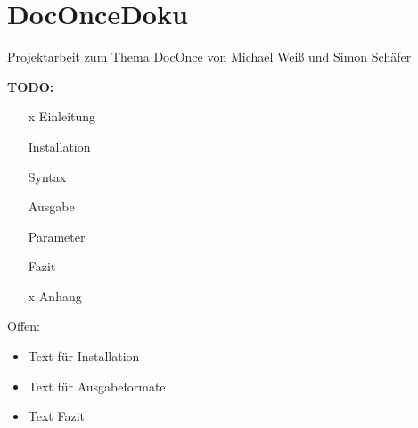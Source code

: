 \documentclass[%
oneside,                 %
final,                   %
chapterprefix=true,      %
open=right,              %
10pt]{book}
\begin{document}



\chapter{DocOnceDoku}
Projektarbeit zum Thema DocOnce von Michael Weiß und Simon Schäfer

\textbf{TODO:}

\begin{itemize}
\item [x] Einleitung

\item [ ] Installation

\item [ ] Syntax

\item [ ] Ausgabe

\item [ ] Parameter

\item [ ] Fazit

\item [x] Anhang
\end{itemize}

\noindent
Offen:
\begin{itemize}
\item Text für Installation

\item Text für Ausgabeformate

\item Text Fazit
\end{itemize}
\end{document}
